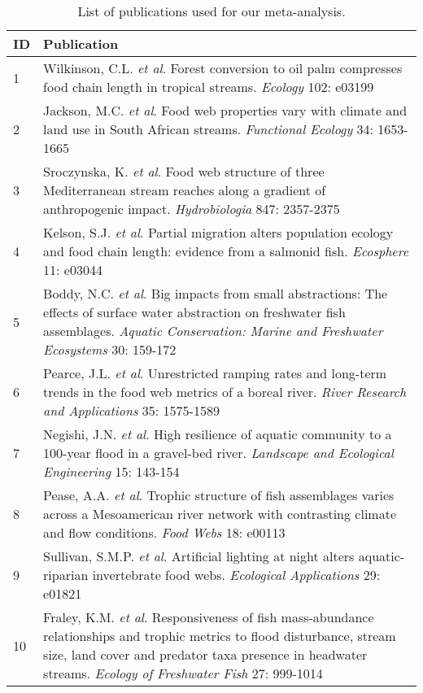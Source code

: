 \begingroup\small
\begin{longtable}{p{}p{}}
\caption{List of publications used for our meta-analysis.
             \label{tab:meta-list}} \\ 
  \hline
ID & Publication \\ 
  \hline
  1 & Wilkinson, C.L. \textit{et al}. Forest conversion to oil palm compresses food chain length in tropical streams. \textit{Ecology} 102: e03199 \\ 
    2 & Jackson, M.C. \textit{et al}. Food web properties vary with climate and land use in South African streams. \textit{Functional Ecology} 34: 1653-1665 \\ 
    3 & Sroczynska, K. \textit{et al}. Food web structure of three Mediterranean stream reaches along a gradient of anthropogenic impact. \textit{Hydrobiologia} 847: 2357-2375 \\ 
    4 & Kelson, S.J. \textit{et al}. Partial migration alters population ecology and food chain length: evidence from a salmonid fish. \textit{Ecosphere} 11: e03044 \\ 
    5 & Boddy, N.C. \textit{et al}. Big impacts from small abstractions: The effects of surface water abstraction on freshwater fish assemblages. \textit{Aquatic Conservation: Marine and Freshwater Ecosystems} 30: 159-172 \\ 
    6 & Pearce, J.L. \textit{et al}. Unrestricted ramping rates and long-term trends in the food web metrics of a boreal river. \textit{River Research and Applications} 35: 1575-1589 \\ 
    7 & Negishi, J.N. \textit{et al}. High resilience of aquatic community to a 100-year flood in a gravel-bed river. \textit{Landscape and Ecological Engineering} 15: 143-154 \\ 
    8 & Pease, A.A. \textit{et al}. Trophic structure of fish assemblages varies across a Mesoamerican river network with contrasting climate and flow conditions. \textit{Food Webs} 18: e00113 \\ 
    9 & Sullivan, S.M.P. \textit{et al}. Artificial lighting at night alters aquatic-riparian invertebrate food webs. \textit{Ecological Applications} 29: e01821 \\ 
   10 & Fraley, K.M. \textit{et al}. Responsiveness of fish mass-abundance relationships and trophic metrics to flood disturbance, stream size, land cover and predator taxa presence in headwater streams. \textit{Ecology of Freshwater Fish} 27: 999-1014 \\ 

\end{longtable}
